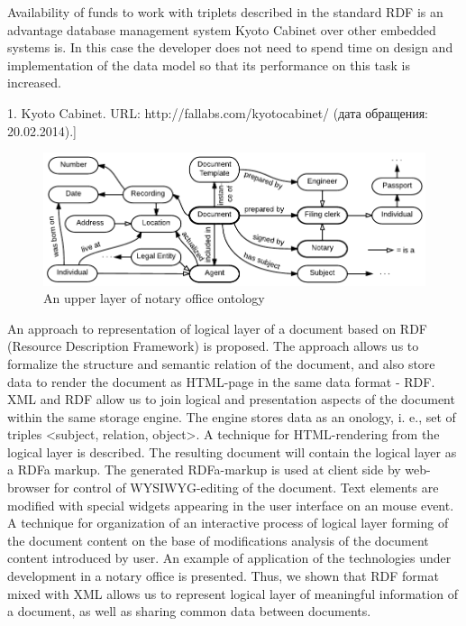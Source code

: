 \documentclass[utf8]{../IncArticle}
\begin{document}
Availability of funds to work with triplets described in the standard RDF is an advantage database management system Kyoto Cabinet over other embedded systems is.  In this case the developer does not need to spend time on design and implementation of the data model so that its performance on this task is increased.

1.	Kyoto Cabinet. URL: http://fallabs.com/kyotocabinet/ (дата обращения: 20.02.2014).]

\begin{figure}[!t]
\centering
\includegraphics[width=\linewidth]{DocumentOntology-en.pdf}
\caption{An upper layer of notary office ontology}
\label{notaryontology}
\end{figure}


\conclusion
An approach to representation of logical layer of a document based on RDF (Resource Description Framework) is proposed.  The approach allows us to formalize the structure and semantic relation of the document, and also store data to render the document as HTML-page in the same data format - RDF.  XML and RDF allow us to join logical and presentation aspects of the document within the same storage engine.  The engine stores data as an onology, i.  e., set of triples <subject, relation, object>.  A technique for HTML-rendering from the logical layer is described.  The resulting document will contain the logical layer as a RDFa markup.  The generated RDFa-markup is used at client side by web-browser for control of WYSIWYG-editing of the document.  Text elements are modified with special widgets appearing in the user interface on an mouse event.  A technique for organization of an interactive process of logical layer forming of the document content on the base of modifications analysis of the document content introduced by user.  An example of application of the technologies under development in a notary office is presented.  Thus, we shown that RDF format mixed with XML allows us to represent logical layer of meaningful information of a document, as well as sharing common data between documents.
\end{document}
